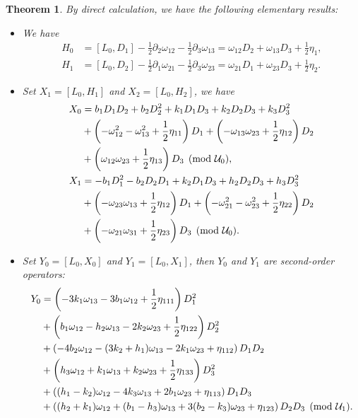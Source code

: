 \documentclass[11pt,a4paper]{article}
\numberwithin{equation}{section}
\theoremstyle{journalplain}
\newtheorem{theorem}{Theorem}[section]
\theoremstyle{journaldef}
\newcommand{\pd}{\partial}
\begin{document}
\begin{theorem}
    By direct calculation, we have the following elementary results:
\begin{itemize}
\item We have
\begin{align}
 H_0&=[L_0,D_1]-\frac12\pd_2\omega_{12}-\frac12\pd_3\omega_{13}
=\omega_{12}D_2+\omega_{13}D_3+\frac12\eta_1,\label{eq:H0bar}\\
 H_1&=[L_0,D_2]-\frac12\pd_1\omega_{21}-\frac12\pd_3\omega_{23}
=\omega_{21}D_1+\omega_{23}D_3+\frac12\eta_2.\label{eq:H1bar}
\end{align}
\item Set $X_1 = [L_0,H_1]$ and $X_2 = [L_0,H_2]$, we have
\begin{align}
 X_0&=b_1D_1D_2+b_2D_2^2+k_1D_1D_3+k_2D_2D_3+k_3D_3^2\notag\\
&+\left(-\omega_{12}^2-\omega_{13}^2+\frac12\eta_{11}\right)D_1
+\left(-\omega_{13}\omega_{23}+\frac12\eta_{12}\right)D_2\notag\\
&+\left(\omega_{12}\omega_{23}+\frac12\eta_{13}\right)D_3
\pmod{\mathcal U_0},\label{eq:X0-comp}\\
 X_1&=-b_1D_1^2-b_2D_2D_1+k_2D_1D_3+h_2D_2D_3+h_3D_3^2\notag\\
&+\left(-\omega_{23}\omega_{13}+\frac12\eta_{12}\right)D_1
+\left(-\omega_{21}^2-\omega_{23}^2+\frac12\eta_{22}\right)D_2\notag\\
&+\left(-\omega_{21}\omega_{31}+\frac12\eta_{23}\right)D_3
\pmod{\mathcal U_0}.\label{eq:X1-comp}
\end{align}
\item Set $Y_0 = [L_0,X_0]$ and $Y_1 = [L_0,X_1]$, then $Y_0$ and $Y_1$ are second-order operators: 
\begin{align}
Y_0&=
\left(-3k_1\omega_{13}-3b_1\omega_{12}+\frac12\eta_{111}\right)D_1^2\notag\\
&+\left(b_1\omega_{12}-h_2\omega_{13}-2k_2\omega_{23}+\frac12\eta_{122}\right)D_2^2\notag\\
&+\left(-4b_2\omega_{12}-(3k_2+h_1)\omega_{13}-2k_1\omega_{23}+\eta_{112}\right)D_1D_2\notag\\
&+\left(h_3\omega_{12}+k_1\omega_{13}+k_2\omega_{23}+\frac12\eta_{133}\right)D_3^2\notag\\
&+\left((h_1-k_2)\omega_{12}-4k_3\omega_{13}+2b_1\omega_{23}+\eta_{113}\right)D_1D_3\notag\\
&+\left((h_2+k_1)\omega_{12}+(b_1-h_3)\omega_{13}
+3(b_2-k_3)\omega_{23}+\eta_{123}\right)D_2D_3
\pmod{\mathcal U_1}.\label{eq:Y0-comp}

\end{align}
\end{itemize}
\end{theorem}
\end{document}
